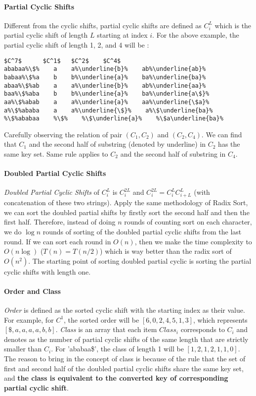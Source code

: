 \documentclass[../main.tex]{subfiles}
\begin{document}
\paragraph{Partial Cyclic Shifts} Different from the cyclic shifts, partial cyclic shifts are defined as $C^{L}_i$ which is the partial cyclic shift of length $L$ starting at index $i$. For the above example, the partial cyclic shift of length 1, 2, and 4 will be :
\begin{lstlisting}[numbers=none,mathescape=true, escapechar=\%]
  $C^7$      $C^1$   $C^2$    $C^4$
ababaa%\$%    a    a%\underline{b}%    ab%\underline{ab}%
babaa%\$%a    b    b%\underline{a}%    ba%\underline{ba}%
abaa%\$%ab    a    a%\underline{b}%    ab%\underline{aa}%
baa%\$%aba    b    b%\underline{a}%    ba%\underline{a\$}%
aa%\$%abab    a    a%\underline{a}%    aa%\underline{\$a}%
a%\$%ababa    a    a%\underline{\$}%    a%\$\underline{ba}%
%\$%ababaa    %\$%    %\$\underline{a}%    %\$a\underline{ba}%
\end{lstlisting}
Carefully observing the relation of pair $(C_1, C_2)$ and $(C_2, C_4)$. We can find that $C_1$ and the second half of substring (denoted by underline) in $C_2$ has the same key set. Same rule applies to $C_2$ and the second half of substring in $C_4$.

\paragraph{Doubled Partial Cyclic Shifts} \textit{Doubled Partial Cyclic Shifts} of $C^L_i$ is $C^{2L}_i$ and $C^{2L}_i = C^{L}_iC^{L}_{i+L}$ (with concatenation of these two strings). Apply the same methodology of Radix Sort, we can sort the doubled partial shifts by firstly sort the second half and then the first half. Therefore, instead of doing $n$ rounds of counting sort on each character, we do $\log n$ rounds of sorting of the doubled partial cyclic shifts from the last round. If we can sort each round in $O(n)$, then we make the time complexity to $O(n \log)$ ($T(n) = T(n/2)$) which is way better than the radix sort of $O(n^2)$.  The starting point of sorting doubled partial cyclic is sorting the partial cyclic shifts with length one. 

\paragraph{Order and Class} \textit{Order} is defined as the sorted cyclic shift with the starting index as their value. For example, for $C^1$, the sorted order will be $[6, 0, 2, 4, 5, 1, 3]$, which represents $[\$, a, a, a, a, b, b]$. \textit{Class} is an array that each item $Class_{i}$ corresponds to $C_i$ and denotes as the number of partial cyclic shifts of the same length that are strictly smaller than $C_i$. For 'ababaa\$', the class of length 1 will be $[1, 2, 1, 2, 1, 1, 0]$. The reason to bring in the concept of class is because of the rule that the set of first and second half of the doubled partial cyclic shifts share the same key set, and \textbf{the class is equivalent to the converted key of corresponding partial cyclic shift}. 
\end{document}
